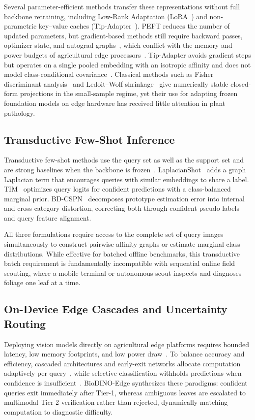 \documentclass[preprint,12pt]{elsarticle}
\begin{document}
Several parameter-efficient methods transfer these representations without full backbone retraining, including Low-Rank Adaptation (LoRA~\cite{hu2022lora}) and non-parametric key--value caches (Tip-Adapter~\cite{zhang2022tip}). PEFT reduces the number of updated parameters, but gradient-based methods still require backward passes, optimizer state, and autograd graphs~\cite{hu2022lora}, which conflict with the memory and power budgets of agricultural edge processors~\cite{radocaj2025evolution}. Tip-Adapter avoids gradient steps but operates on a single pooled embedding with an isotropic affinity and does not model class-conditional covariance~\cite{zhang2022tip}. Classical methods such as Fisher discriminant analysis~\cite{fisher1936use} and Ledoit--Wolf shrinkage~\cite{ledoit2004well} give numerically stable closed-form projections in the small-sample regime, yet their use for adapting frozen foundation models on edge hardware has received little attention in plant pathology.

\subsection{Transductive Few-Shot Inference}
Transductive few-shot methods use the query set as well as the support set and are strong baselines when the backbone is frozen~\cite{boudiaf2020transductive,ziko2020laplacian}. LaplacianShot~\cite{ziko2020laplacian} adds a graph Laplacian term that encourages queries with similar embeddings to share a label. TIM~\cite{boudiaf2020transductive} optimizes query logits for confident predictions with a class-balanced marginal prior. BD-CSPN~\cite{liu2020bdcspn} decomposes prototype estimation error into internal and cross-category distortion, correcting both through confident pseudo-labels and query feature alignment.

All three formulations require access to the complete set of query images simultaneously to construct pairwise affinity graphs or estimate marginal class distributions. While effective for batched offline benchmarks, this transductive batch requirement is fundamentally incompatible with sequential online field scouting, where a mobile terminal or autonomous scout inspects and diagnoses foliage one leaf at a time.

\subsection{On-Device Edge Cascades and Uncertainty Routing}
Deploying vision models directly on agricultural edge platforms requires bounded latency, low memory footprints, and low power draw~\cite{radocaj2025evolution,sharif2026real}. To balance accuracy and efficiency, cascaded architectures and early-exit networks allocate computation adaptively per query~\cite{viola2001rapid,teerapittayanon2016branchynet}, while selective classification withholds predictions when confidence is insufficient~\cite{geifman2017selective,traub2024overcoming}. BioDINO-Edge synthesizes these paradigms: confident queries exit immediately after Tier-1, whereas ambiguous leaves are escalated to multimodal Tier-2 verification rather than rejected, dynamically matching computation to diagnostic difficulty.
\end{document}
